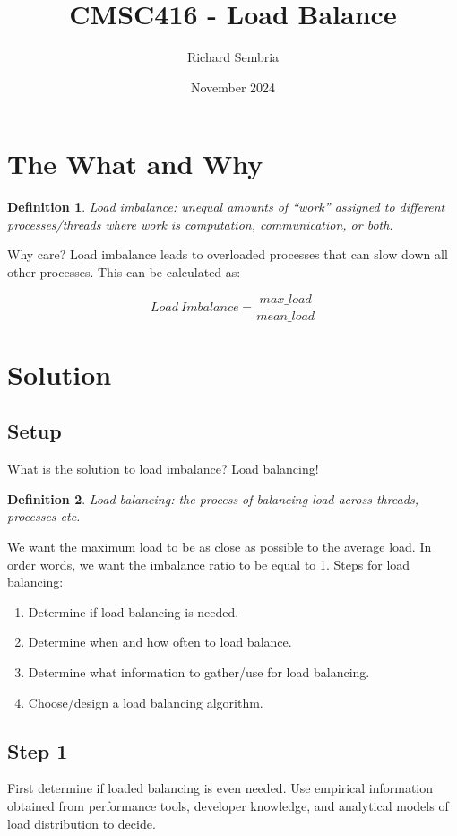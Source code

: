 \documentclass{article}
\title{CMSC416 - Load Balance}
\author{Richard Sembria}
\date{November 2024}
\newtheorem{definition}{Definition}
\begin{document}
\maketitle

\newpage
\section{The What and Why}
\begin{definition}
    Load imbalance: unequal amounts of “work” assigned to different processes/threads where work is computation, communication, or both.
\end{definition}
Why care? Load imbalance leads to overloaded processes that can slow down all other processes. This can be calculated as:

\begin{equation}
    Load\ Imbalance = \frac{max\_load}{mean\_load}
\end{equation}

\section{Solution}
\subsection{Setup}
What is the solution to load imbalance? Load balancing!
\begin{definition}
    Load balancing: the process of balancing load across threads, processes etc.
\end{definition}
We want the maximum load to be as close as possible to the average load. In order words, we want the imbalance ratio to be equal to 1. Steps for load balancing: 

\begin{enumerate}
    \item Determine if load balancing is needed.
    \item Determine when and how often to load balance.
    \item Determine what information to gather/use for load balancing.
    \item Choose/design a load balancing algorithm.
\end{enumerate}

\subsection{Step 1}
First determine if loaded balancing is even needed. Use empirical information obtained from performance tools, developer knowledge, and analytical models of load distribution to decide.
\end{document}
